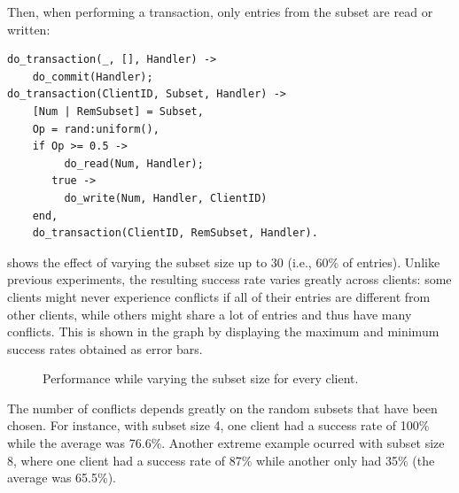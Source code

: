 \documentclass[a4paper, 10pt]{article}
\begin{document}
Then, when performing a transaction, only entries from the subset are read or written:
\begin{verbatim}
do_transaction(_, [], Handler) ->
    do_commit(Handler);
do_transaction(ClientID, Subset, Handler) ->
    [Num | RemSubset] = Subset,
    Op = rand:uniform(),
    if Op >= 0.5 ->
         do_read(Num, Handler);
       true ->
         do_write(Num, Handler, ClientID)
    end,
    do_transaction(ClientID, RemSubset, Handler).
\end{verbatim}

 shows the effect of varying the subset size up to 30 (i.e., 60\% of entries).
Unlike previous experiments, the resulting success rate varies greatly across clients: some clients might never experience conflicts if all of their entries are different from other clients, while others might share a lot of entries and thus have many conflicts.
This is shown in the graph by displaying the maximum and minimum success rates obtained as error bars.

\begin{figure}[htp]
\begin{center}
\caption{Performance while varying the subset size for every client.}
\label{fig:vi}
\end{center}
\end{figure}

The number of conflicts depends greatly on the random subsets that have been chosen.
For instance, with subset size 4, one client had a success rate of 100\% while the average was 76.6\%.
Another extreme example ocurred with subset size 8, where one client had a success rate of 87\% while another only had 35\% (the average was 65.5\%). %
\end{document}
